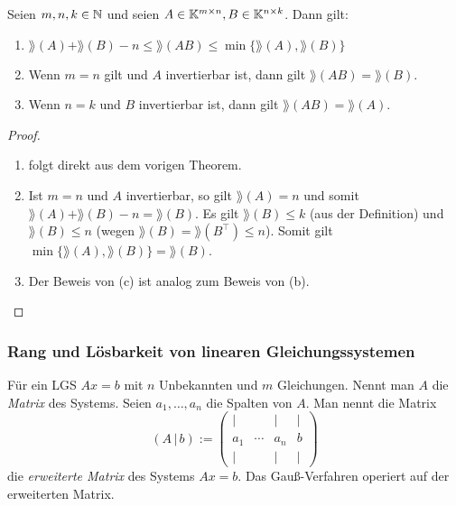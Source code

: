 \begin{klr}
	Seien $ m,n,k \in \mathbb N $ und seien $ A \in \mathbb K^{m \times n}, B \in \mathbb K^{n \times k} $. Dann gilt:
	\begin{enumerate}[label=\normalfont(\alph*)]
		\item $ \rang(A) + \rang(B) - n \leq \rang(AB) \leq \min\{ \rang(A), \rang(B) \} $
		\item Wenn $ m=n $ gilt und $ A $ invertierbar ist, dann gilt $ \rang(AB) = \rang(B) $.
		\item Wenn $ n=k $ und $ B $ invertierbar ist, dann gilt $ \rang(AB) = \rang(A) $.
	\end{enumerate}
\end{klr}
\begin{proof}
\begin{enumerate}[label=\normalfont(\alph*)]
	\item
		folgt direkt aus dem vorigen Theorem.
	\item
		Ist $ m=n $ und $ A $ invertierbar, so gilt $ \rang(A) = n $ und somit $ \rang(A) + \rang(B) - n = \rang(B) $. Es gilt $ \rang(B) \leq k $ (aus der Definition) und $ \rang(B) \leq n $ (wegen $ \rang(B) = \rang(B^\top) \leq n $). Somit gilt $ \min\{ \rang(A), \rang(B) \} = \rang(B) $.
	\item
		Der Beweis von (c) ist analog zum Beweis von (b). \qedhere
\end{enumerate}
\end{proof}

\subsubsection{Rang und Lösbarkeit von linearen Gleichungssystemen}

Für ein LGS $A x = b$ mit $n$ Unbekannten und $m$ Gleichungen. Nennt man $A$ die \emph{Matrix} des Systems. Seien $ a_1, \ldots, a_n $ die Spalten von $ A $. Man nennt die Matrix 
\[
	 (A \, | \, b) := \begin{pmatrix} 
	  | &  & | & |
	  \\
	 a_1 & \cdots & a_n & b 
	 \\ | &  & | & | \end{pmatrix} 
\]
die \emph{erweiterte Matrix} des Systems $Ax =b$. Das Gauß-Verfahren operiert auf der erweiterten Matrix. 

